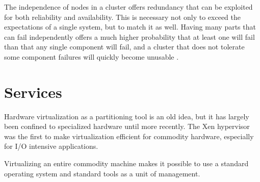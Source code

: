 The independence of nodes in a cluster offers redundancy that can be exploited for both reliability and availability. This is necessary not only to exceed the expectations of a single system, but to match it as well. Having many parts that can fail independently offers a much higher probability that at least one will fail than that any single component will fail, and a cluster that does not tolerate some component failures will quickly become unusable \cite{birrell93}.

\section{Services}

Hardware virtualization as a partitioning tool is an old idea, but it has largely been confined to specialized hardware until more recently. The Xen hypervisor \cite{barham} was the first to make virtualization efficient for commodity hardware, especially for I/O intensive applications.

Virtualizing an entire commodity machine makes it possible to use a standard operating system and standard tools as a unit of management. \cite{hand}